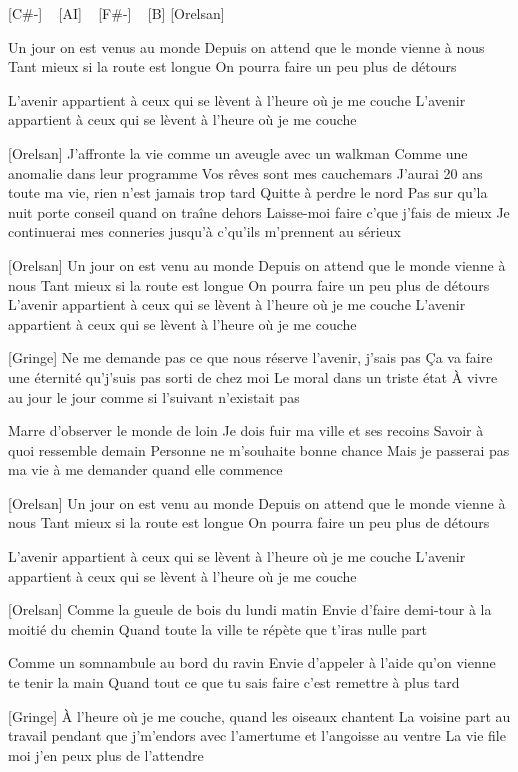  
[C#-] ~ [AI] ~ [F#-] ~ [B]
 [Orelsan]

Un jour on est venus au monde
Depuis on attend que le monde vienne à nous
Tant mieux si la route est longue
On pourra faire un peu plus de détours

L'avenir appartient à ceux qui se lèvent à l'heure où je me couche
L'avenir appartient à ceux qui se lèvent à l'heure où je me couche

[Orelsan]
J'affronte la vie comme un aveugle avec un walkman
Comme une anomalie dans leur programme
Vos rêves sont mes cauchemars
J'aurai 20 ans toute ma vie, rien n'est jamais trop tard
Quitte à perdre le nord
Pas sur qu'la nuit porte conseil quand on traîne dehors
Laisse-moi faire c'que j'fais de mieux
Je continuerai mes conneries jusqu'à c'qu'ils m'prennent au sérieux


[Orelsan]
Un jour on est venu au monde
Depuis on attend que le monde vienne à nous
Tant mieux si la route est longue
On pourra faire un peu plus de détours
L'avenir appartient à ceux qui se lèvent à l'heure où je me couche
L'avenir appartient à ceux qui se lèvent à l'heure où je me couche

[Gringe]
Ne me demande pas ce que nous réserve l'avenir, j'sais pas
Ça va faire une éternité qu'j'suis pas sorti de chez moi
Le moral dans un triste état
À vivre au jour le jour comme si l'suivant n'existait pas

Marre d'observer le monde de loin
Je dois fuir ma ville et ses recoins
Savoir à quoi ressemble demain
Personne ne m'souhaite bonne chance
Mais je passerai pas ma vie à me demander quand elle commence

[Orelsan]
Un jour on est venu au monde
Depuis on attend que le monde vienne à nous
Tant mieux si la route est longue
On pourra faire un peu plus de détours

L'avenir appartient à ceux qui se lèvent à l'heure où je me couche
L'avenir appartient à ceux qui se lèvent à l'heure où je me couche


[Orelsan]
Comme la gueule de bois du lundi matin
Envie d'faire demi-tour à la moitié du chemin
Quand toute la ville te répète que t'iras nulle part

Comme un somnambule au bord du ravin
Envie d'appeler à l'aide qu'on vienne te tenir la main
Quand tout ce que tu sais faire c'est remettre à plus tard

[Gringe]
À l'heure où je me couche, quand les oiseaux chantent
La voisine part au travail pendant que j'm'endors avec l'amertume et l'angoisse au ventre
La vie file moi j'en peux plus de l'attendre

